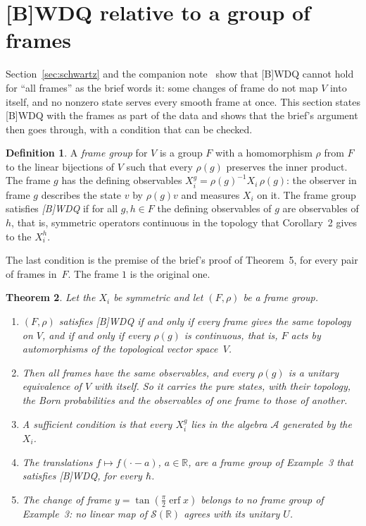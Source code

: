 \documentclass[11pt]{article}
\newtheorem{theorem}{Theorem}[section]
\theoremstyle{definition}
\newtheorem{definition}[theorem]{Definition}
\begin{document}
\section{[B]WDQ relative to a group of frames}
\label{sec:framegroup}

Section~\ref{sec:schwartz} and the companion note~\cite[Sec.~2]{further-hilbert} show that
[B]WDQ cannot hold for ``all frames'' as the brief words it: some changes of frame do not map
$V$ into itself, and no nonzero state serves every smooth frame at once. This section states
[B]WDQ with the frames as part of the data and shows that the brief's argument then goes through,
with a condition that can be checked.

\begin{definition}\label{def:framegroup}
  A \emph{frame group} for $V$ is a group $F$ with a homomorphism $\rho$ from $F$ to the linear
  bijections of $V$ such that every $\rho(g)$ preserves the inner product. The frame $g$ has the
  defining observables $X_i^g = \rho(g)^{-1}X_i\,\rho(g)$: the observer in frame $g$ describes the
  state $v$ by $\rho(g)v$ and measures $X_i$ on it. The frame group satisfies \emph{[B]WDQ} if for
  all $g, h \in F$ the defining observables of $g$ are observables of $h$, that is, symmetric
  operators continuous in the topology that Corollary~2 gives to the $X_i^h$.
\end{definition}

The last condition is the premise of the brief's proof of Theorem~5, for every pair of frames
in~$F$. The frame $1$ is the original one.

\begin{theorem}\label{thm:framegroup}
  Let the $X_i$ be symmetric and let $(F, \rho)$ be a frame group.
  \begin{enumerate}
    \item $(F, \rho)$ satisfies [B]WDQ if and only if every frame gives the same topology on $V$,
      and if and only if every $\rho(g)$ is continuous, that is, $F$ acts by automorphisms of the
      topological vector space~$V$.
    \item Then all frames have the same observables, and every $\rho(g)$ is a unitary equivalence
      of $V$ with itself. So it carries the pure states, with their topology, the Born
      probabilities and the observables of one frame to those of another.
    \item A sufficient condition is that every $X_i^g$ lies in the algebra $\mathcal A$ generated
      by the~$X_i$.
    \item The translations $f \mapsto f(\cdot - a)$, $a \in \mathbb R$, are a frame group of
      Example~3 that satisfies [B]WDQ, for every $\hbar$.
    \item The change of frame $y = \tan(\frac\pi2\operatorname{erf}x)$ belongs to no frame group of
      Example~3: no linear map of $\mathcal S(\mathbb R)$ agrees with its unitary $U$.
  \end{enumerate}
\end{theorem}
\end{document}
